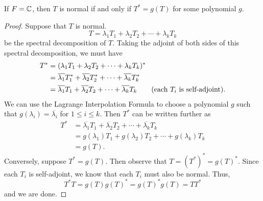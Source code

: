\begin{corollary}
    If \(F = \mathbb{C}  \), then \( T  \) is normal if and only if \( T^{*} = g(T) \) for some polynomial \( g  \).
\end{corollary}
\begin{proof}
Suppose that \( T  \) is normal.
\[  T = {\lambda}_{1} {T}_{1} + {\lambda}_{2} {T}_{2} + \cdots + {\lambda}_{k} {T}_{k} \] be the spectral decomposition of \( T  \). Taking the adjoint of both sides of this spectral decomposition, we must have
\begin{align*}
    T^{*} &= ({\lambda}_{1} {T}_{1} + {\lambda}_{2} {T}_{2} + \cdots + {\lambda}_{k} {T}_{k})^{*} \\
          &= \overline{{\lambda}_{1}} {T}_{1}^{*} + \overline{{\lambda}_{2}} {T}_{2}^{*} + \cdots + \overline{{\lambda}_{k}} {T}_{k}^{*} \\
          &= \overline{{\lambda}_{1}} {T}_{1}  + \overline{{\lambda}_{2}} {T}_{2} + \cdots + \overline{{\lambda}_{k}} {T}_{k} \tag{each \( {T}_{i} \) is self-adjoint}.
\end{align*}
We can use the Lagrange Interpolation Formula to choose a polynomial \( g  \) such that \( g({\lambda}_{i}) = \overline{{\lambda}_{i}}  \) for \( 1 \leq i \leq k  \). Then \( T^{*} \) can be written further as  
\begin{align*}
    T^{*} &= \overline{{\lambda}_{1}} {T}_{1}  + \overline{{\lambda}_{2}} {T}_{2} + \cdots + \overline{{\lambda}_{k}} {T}_{k}  \\
          &= g({\lambda}_{1}) {T}_{1} + g({\lambda}_{2}){T}_{2} + \cdots + g({\lambda}_{k}) {T}_{k} \\
          &= g(T).
  \end{align*}
  Conversely, suppose \( T^{*} = g(T) \). Then observe that \( T = (T^{*})^{*} = g(T)^{*} \). Since each \( {T}_{i} \) is self-adjoint, we know that each \( {T}_{i}  \) must also be normal. Thus, 
  \[  T^{*}T = g(T)g(T)^{*} = g(T)^{*} g(T) = T T^{*}  \]
  and we are done.
\end{proof}

